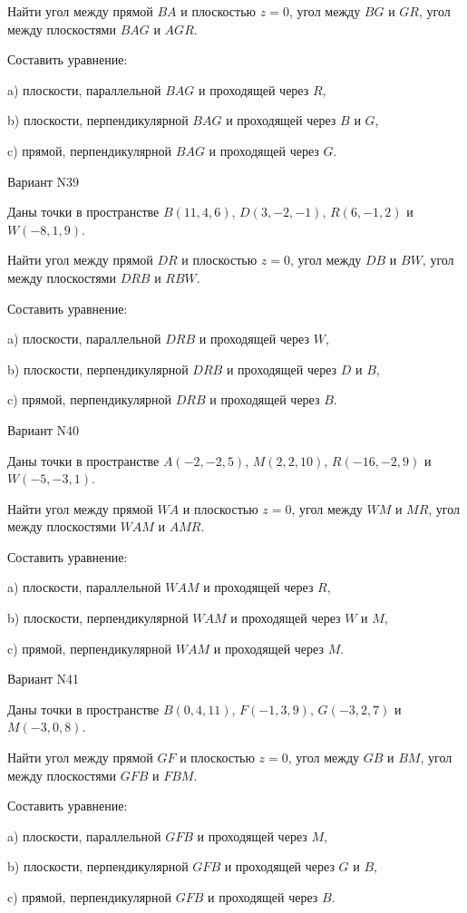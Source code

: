 \documentclass[11pt]{report}
\begin{document}
Найти угол между прямой $BA$ и плоскостью $z = 0$, угол между $BG$ и $GR$, угол между плоскостями $BAG$ 
и $AGR$.

Составить уравнение: 

a) плоскости, параллельной $BAG$ и проходящей через $R$,

b) плоскости, перпендикулярной $BAG$ и проходящей через $B$ и $G$,

c) прямой, перпендикулярной $BAG$ и проходящей через $G$.

Вариант N39

Даны точки в пространстве
$B(11, 4, 6)$, $D(3, -2, -1)$, $R(6, -1, 2)$ и
$W(-8, 1, 9)$.

Найти угол между прямой $DR$ и плоскостью $z = 0$, угол между $DB$ и $BW$, угол между плоскостями $DRB$ 
и $RBW$.

Составить уравнение: 

a) плоскости, параллельной $DRB$ и проходящей через $W$,

b) плоскости, перпендикулярной $DRB$ и проходящей через $D$ и $B$,

c) прямой, перпендикулярной $DRB$ и проходящей через $B$.

Вариант N40

Даны точки в пространстве
$A(-2, -2, 5)$, $M(2, 2, 10)$, $R(-16, -2, 9)$ и
$W(-5, -3, 1)$.

Найти угол между прямой $WA$ и плоскостью $z = 0$, угол между $WM$ и $MR$, угол между плоскостями $WAM$ 
и $AMR$.

Составить уравнение: 

a) плоскости, параллельной $WAM$ и проходящей через $R$,

b) плоскости, перпендикулярной $WAM$ и проходящей через $W$ и $M$,

c) прямой, перпендикулярной $WAM$ и проходящей через $M$.

Вариант N41

Даны точки в пространстве
$B(0, 4, 11)$, $F(-1, 3, 9)$, $G(-3, 2, 7)$ и
$M(-3, 0, 8)$.

Найти угол между прямой $GF$ и плоскостью $z = 0$, угол между $GB$ и $BM$, угол между плоскостями $GFB$ 
и $FBM$.

Составить уравнение: 

a) плоскости, параллельной $GFB$ и проходящей через $M$,

b) плоскости, перпендикулярной $GFB$ и проходящей через $G$ и $B$,

c) прямой, перпендикулярной $GFB$ и проходящей через $B$.
\end{document}

